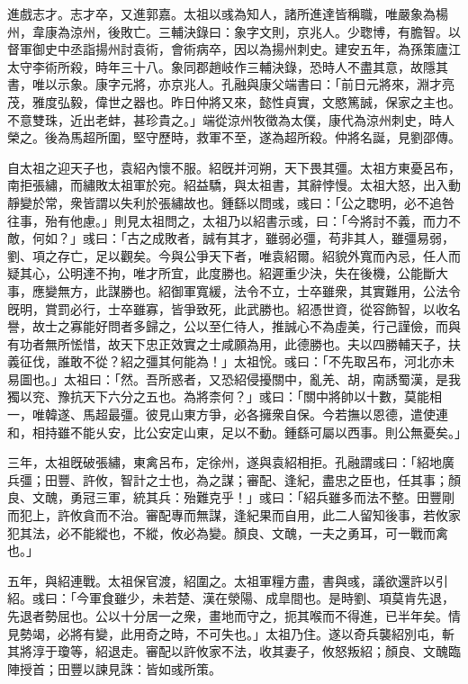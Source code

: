 \begin{pinyinscope}
進戲志才。志才卒，又進郭嘉。太祖以彧為知人，諸所進達皆稱職，唯嚴象為楊州，韋康為涼州，後敗亡。三輔決錄曰：象字文則，京兆人。少聦博，有膽智。以督軍御史中丞詣揚州討袁術，會術病卒，因以為揚州刺史。建安五年，為孫策廬江太守李術所殺，時年三十八。象同郡趙岐作三輔決錄，恐時人不盡其意，故隱其書，唯以示象。康字元將，亦京兆人。孔融與康父端書曰：「前日元將來，淵才亮茂，雅度弘毅，偉世之器也。昨日仲將又來，懿性貞實，文愍篤誠，保家之主也。不意雙珠，近出老蚌，甚珍貴之。」端從涼州牧徵為太僕，康代為涼州刺史，時人榮之。後為馬超所圍，堅守歷時，救軍不至，遂為超所殺。仲將名誕，見劉邵傳。

自太祖之迎天子也，袁紹內懷不服。紹旣并河朔，天下畏其彊。太祖方東憂呂布，南拒張繡，而繡敗太祖軍於宛。紹益驕，與太祖書，其辭悖慢。太祖大怒，出入動靜變於常，衆皆謂以失利於張繡故也。鍾繇以問彧，彧曰：「公之聦明，必不追咎往事，殆有他慮。」則見太祖問之，太祖乃以紹書示彧，曰：「今將討不義，而力不敵，何如？」彧曰：「古之成敗者，誠有其才，雖弱必彊，苟非其人，雖彊易弱，劉、項之存亡，足以觀矣。今與公爭天下者，唯袁紹爾。紹貌外寬而內忌，任人而疑其心，公明達不拘，唯才所宜，此度勝也。紹遲重少決，失在後機，公能斷大事，應變無方，此謀勝也。紹御軍寬緩，法令不立，士卒雖衆，其實難用，公法令旣明，賞罰必行，士卒雖寡，皆爭致死，此武勝也。紹憑世資，從容飾智，以收名譽，故士之寡能好問者多歸之，公以至仁待人，推誠心不為虛美，行己謹儉，而與有功者無所恡惜，故天下忠正效實之士咸願為用，此德勝也。夫以四勝輔天子，扶義征伐，誰敢不從？紹之彊其何能為！」太祖恱。彧曰：「不先取呂布，河北亦未易圖也。」太祖曰：「然。吾所惑者，又恐紹侵擾關中，亂羌、胡，南誘蜀漢，是我獨以兖、豫抗天下六分之五也。為將柰何？」彧曰：「關中將帥以十數，莫能相一，唯韓遂、馬超最彊。彼見山東方爭，必各擁衆自保。今若撫以恩德，遣使連和，相持雖不能乆安，比公安定山東，足以不動。鍾繇可屬以西事。則公無憂矣。」

三年，太祖旣破張繡，東禽呂布，定徐州，遂與袁紹相拒。孔融謂彧曰：「紹地廣兵彊；田豐、許攸，智計之士也，為之謀；審配、逢紀，盡忠之臣也，任其事；顏良、文醜，勇冠三軍，統其兵：殆難克乎！」彧曰：「紹兵雖多而法不整。田豐剛而犯上，許攸貪而不治。審配專而無謀，逢紀果而自用，此二人留知後事，若攸家犯其法，必不能縱也，不縱，攸必為變。顏良、文醜，一夫之勇耳，可一戰而禽也。」

五年，與紹連戰。太祖保官渡，紹圍之。太祖軍糧方盡，書與彧，議欲還許以引紹。彧曰：「今軍食雖少，未若楚、漢在滎陽、成皐間也。是時劉、項莫肯先退，先退者勢屈也。公以十分居一之衆，畫地而守之，扼其喉而不得進，已半年矣。情見勢竭，必將有變，此用奇之時，不可失也。」太祖乃住。遂以奇兵襲紹別屯，斬其將淳于瓊等，紹退走。審配以許攸家不法，收其妻子，攸怒叛紹；顏良、文醜臨陣授首；田豐以諫見誅：皆如彧所策。


\end{pinyinscope}
